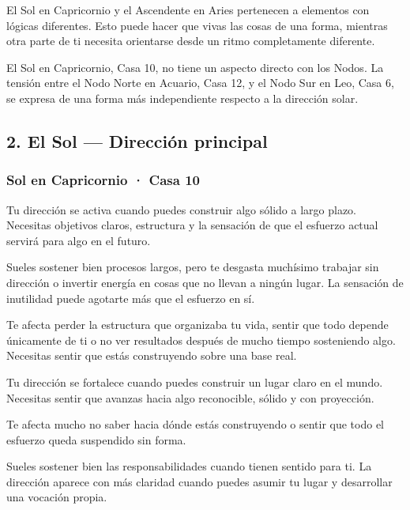 \documentclass[11pt,a4paper]{article}
\begin{document}
El Sol en Capricornio y el Ascendente en Aries pertenecen a elementos con lógicas diferentes. Esto puede hacer que vivas las cosas de una forma, mientras otra parte de ti necesita orientarse desde un ritmo completamente diferente.

El Sol en Capricornio, Casa 10, no tiene un aspecto directo con los Nodos. La tensión entre el Nodo Norte en Acuario, Casa 12, y el Nodo Sur en Leo, Casa 6, se expresa de una forma más independiente respecto a la dirección solar.

\vspace{0.5cm}


\subsection{2. El Sol — Dirección principal}

\subsubsection*{Sol en Capricornio · Casa 10}

Tu dirección se activa cuando puedes construir algo sólido a largo plazo. Necesitas objetivos claros, estructura y la sensación de que el esfuerzo actual servirá para algo en el futuro.

Sueles sostener bien procesos largos, pero te desgasta muchísimo trabajar sin dirección o invertir energía en cosas que no llevan a ningún lugar. La sensación de inutilidad puede agotarte más que el esfuerzo en sí.

Te afecta perder la estructura que organizaba tu vida, sentir que todo depende únicamente de ti o no ver resultados después de mucho tiempo sosteniendo algo. Necesitas sentir que estás construyendo sobre una base real.

Tu dirección se fortalece cuando puedes construir un lugar claro en el mundo. Necesitas sentir que avanzas hacia algo reconocible, sólido y con proyección.

Te afecta mucho no saber hacia dónde estás construyendo o sentir que todo el esfuerzo queda suspendido sin forma.

Sueles sostener bien las responsabilidades cuando tienen sentido para ti. La dirección aparece con más claridad cuando puedes asumir tu lugar y desarrollar una vocación propia.
\end{document}
